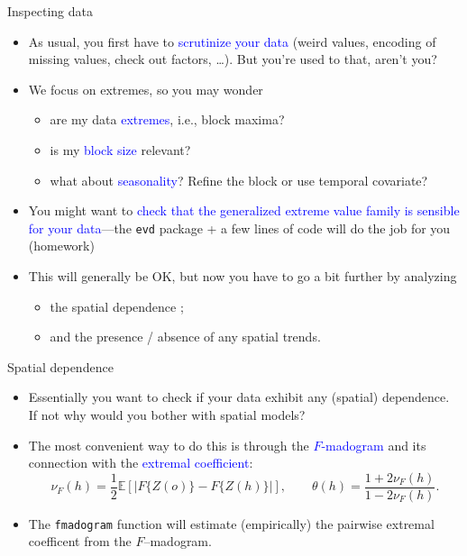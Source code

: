 \message{ !name(showv2.tex)}\documentclass[mode=present,style=simple]{powerdot}
\theoremstyle{plain}%
\theoremstyle{definition}
\theoremstyle{remark}
\begin{document}
\begin{slide}[toc=First look]{Inspecting data}
  \begin{itemize}
  \item As usual, you first have to \textcolor{blue}{scrutinize your
      data} (weird values, encoding of missing values, check out
    factors, \ldots). But you're used to that, aren't you?
  \item We focus on extremes, so you may wonder
    \begin{itemize}
    \item are my data \textcolor{blue}{extremes}, i.e., block maxima?
    \item is my \textcolor{blue}{block size} relevant?
    \item what about \textcolor{blue}{seasonality}? Refine the block
      or use temporal covariate?
    \end{itemize}
  \item You might want to \textcolor{blue}{check that the generalized
      extreme value family is sensible for your data}---the
    \texttt{evd} package + a few lines of code will do the job for you
    (homework)
  \item This will generally be OK, but now you have to go a bit
    further by analyzing
    \begin{itemize}
    \item the spatial dependence ;
    \item and the presence / absence of any spatial trends.
    \end{itemize}
  \end{itemize}
\end{slide}

\begin{slide}{Spatial dependence}
  \begin{itemize}
  \item Essentially you want to check if your data exhibit any
    (spatial) dependence. If not why would you bother with spatial
    models?
  \item The most convenient way to do this is through the
    \textcolor{blue}{$F$-madogram} and its connection with the
    \textcolor{blue}{extremal coefficient}:
    \begin{equation*}
      \nu_F(h) = \frac{1}{2} \mathbb{E} [| F\{Z(o)\} - F\{Z(h)\}| ],
      \qquad \theta(h) = \frac{1 + 2 \nu_F(h)}{1 - 2 \nu_F(h)}.
    \end{equation*}
  \item The \texttt{fmadogram} function will estimate (empirically)
    the pairwise extremal coefficent from the $F$--madogram.
  \end{itemize}

\end{slide}
\end{document}
